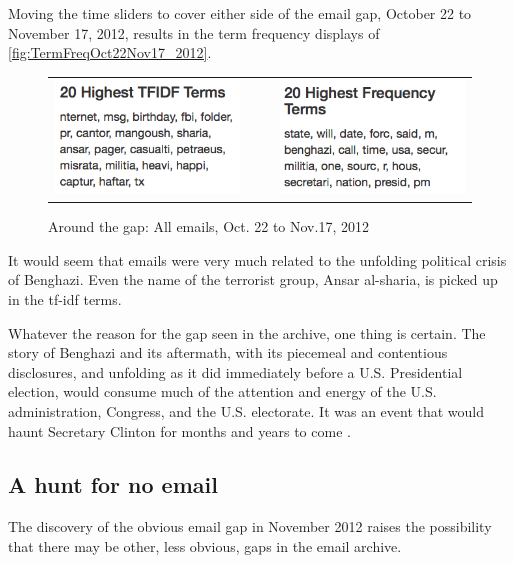 \documentclass[journal]{vgtc}                %
\begin{document}
Moving the time sliders to cover either side of the email gap, October 22 to November 17, 2012, results in  the term frequency displays of \autoref{fig:TermFreqOct22Nov17_2012}.
\begin{figure}[h]
\begin{center}
\begin{tabular}{ccc}
\includegraphics[width=0.4\linewidth]{TFIDFOct22Nov17_2012} &
$~~~~$ &
\includegraphics[width=0.4\linewidth]{TermFreqOct22Nov17_2012} 
\end{tabular}
\caption{Around the gap: All emails, Oct. 22 to Nov.17, 2012}
\label{fig:TermFreqOct22Nov17_2012}
\end{center}
\end{figure}
It would seem that emails were very much related to the unfolding political crisis of Benghazi.  Even the name of the terrorist group, Ansar al-sharia, is picked up in the tf-idf terms.

Whatever the reason for the gap seen in the archive, one thing is certain.
The story of Benghazi and its aftermath, with its piecemeal and contentious disclosures, and unfolding as it did immediately before a U.S. Presidential election, would consume much of the attention and energy of the U.S. administration, Congress, and the U.S. electorate.  It was an event that would haunt Secretary Clinton for months and years  to come \cite{benghaziTimelineWikipedia}.

\subsection{A hunt for no email}
\label{sect:emailZeros}
The discovery of the obvious email gap in November 2012 raises the possibility that there may be other, less obvious, gaps in the email archive.  
\end{document}
